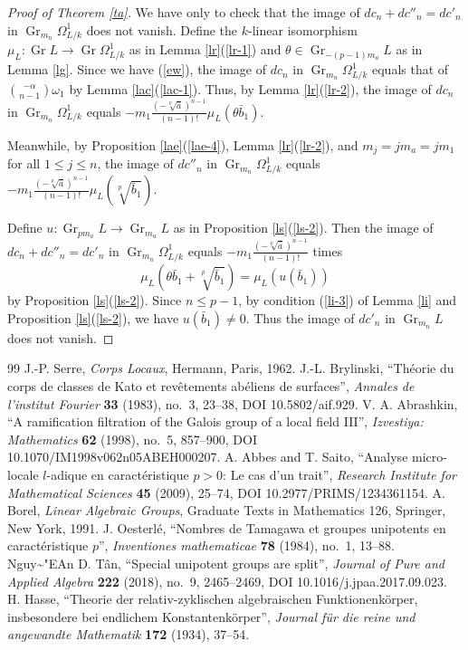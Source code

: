 \documentclass[10pt,a4paper]{amsart}
\newcommand{\ecircumflex}{\char"EA}
\numberwithin{equation}{section}
\newcommand{\Gr}{\operatorname{Gr}}
\theoremstyle{plain}
\theoremstyle{definition}
\begin{document}
\begin{proof}[Proof of Theorem \ref{ta}]
We have only to check that the image of $dc_n+dc''_n=dc'_n$ in $\Gr_{m_n}\Omega_{L/k}^1$ does not vanish. Define the $k$-linear isomorphism $\mu_{L}:\Gr L\to\Gr \Omega_{L/k}^1$ as in Lemma \ref{lr}(\ref{lr-1}) and $\theta\in \Gr_{-(p-1)m_a}L$ as in Lemma \ref{lg}. Since we have (\ref{ew}), the image of $dc_n$ in $\Gr_{m_n}\Omega_{L/k}^1$ equals that of $\displaystyle{\binom{-\alpha}{n-1}\omega_1}$ by Lemma \ref{lac}(\ref{lac-1}). Thus, by Lemma \ref{lr}(\ref{lr-2}), the image of $dc_n$ in $\Gr_{m_n}\Omega_{L/k}^1$ equals $\displaystyle{-m_1\frac{(-\sqrt[p]{\bar{a}})^{n-1}}{(n-1)!}\mu_{L}(\theta\bar{b}_1)}$.

Meanwhile, by Proposition \ref{lae}(\ref{lae-4}), Lemma \ref{lr}(\ref{lr-2}), and $m_j=jm_a=jm_1$ for all $1\leq j\leq n$, the image of $dc''_n$ in $\Gr_{m_n}\Omega_{L/k}^1$ equals $\displaystyle{-m_1\frac{(-\sqrt[p]{\bar{a}})^{n-1}}{(n-1)!}\mu_{L}\left(\sqrt[p]{\bar{b}_1}\right)}$.

Define $u:\Gr_{pm_a}L\to\Gr_{m_a}L$ as in Proposition \ref{ls}(\ref{ls-2}). Then the image of $dc_n+dc''_n=dc'_n$ in $\Gr_{m_n}\Omega_{L/k}^1$ equals $\displaystyle{-m_1\frac{(-\sqrt[p]{\bar{a}})^{n-1}}{(n-1)!}}$ times
\begin{equation}
\mu_{L}\left(\theta\bar{b}_1+\sqrt[p]{\bar{b}_1}\right)=\mu_{L}(u(\bar{b}_1))
\end{equation}
by Proposition \ref{ls}(\ref{ls-2}). Since $n\leq p-1$, by condition (\ref{li-3}) of Lemma \ref{li} and Proposition \ref{ls}(\ref{ls-2}), we have $u(\bar{b}_1)\neq 0$. Thus the image of $dc'_n$ in $\Gr_{m_n}L$ does not vanish. 
\end{proof}

\begin{thebibliography}{99}
 J.-P. Serre, \emph{Corps Locaux}, Hermann, Paris, 1962.
 J.-L. Brylinski, ``Th\'eorie du corps de classes de Kato et rev\^etements ab\'eliens de surfaces'', \emph{Annales de l'institut Fourier} \textbf{33} (1983), no.~3, 23--38, DOI 10.5802/aif.929.
 V. A. Abrashkin, ``A ramification filtration of the Galois group of a local field III'', \emph{Izvestiya: Mathematics} \textbf{62} (1998), no.~5, 857--900, DOI 10.1070/IM1998v062n05ABEH000207.
 A. Abbes and T. Saito, ``Analyse micro-locale $l$-adique en caract\'eristique $p>0$: Le cas d'un trait'', \emph{Research Institute for Mathematical Sciences} \textbf{45} (2009), 25--74, DOI 10.2977/PRIMS/1234361154.
 A. Borel, \emph{Linear Algebraic Groups}, Graduate Texts in Mathematics 126, Springer, New York, 1991.
 J. Oesterl\'e, ``Nombres de Tamagawa et groupes unipotents en caract\'eristique $p$'', \emph{Inventiones mathematicae} \textbf{78} (1984), no.~1, 13--88.
 {\selectfont Nguy\~\ecircumflex{}n} D. T\^an, ``Special unipotent groups are split'', \emph{Journal of Pure and Applied Algebra} \textbf{222} (2018), no.~9, 2465--2469, DOI 10.1016/j.jpaa.2017.09.023.
 H. Hasse, ``Theorie der relativ-zyklischen algebraischen Funktionenk\"orper, insbesondere bei endlichem Konstantenk\"orper'', \emph{Journal f\"ur die reine und angewandte Mathematik} \textbf{172} (1934), 37--54.
\end{thebibliography}
\end{document}
